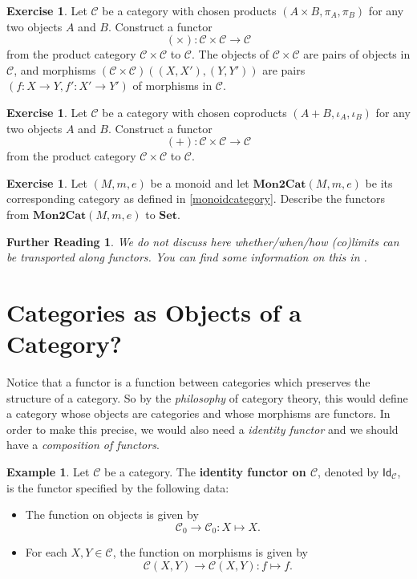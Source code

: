 \documentclass[a4paper,11pt, oneside,titlepage=false]{scrbook}
\theoremstyle{plain}
\newtheorem*{reading*}{Further Reading}
\theoremstyle{definition}
\newtheorem{exa}[thm]{Example}
\newtheorem{exer}[thm]{Exercise}
\newcommand{\cfont}[1]{\ensuremath{\mathsf{#1}}}
\newcommand{\Cat}[1]{\mathcal{#1}}
\newcommand{\CC}{\Cat{C}}
\newcommand{\Catb}[1]{\mathbf{#1}}
\newcommand{\SET}{\Catb{Set}}
\newcommand{\MONtoCAT}{\Catb{Mon2Cat}}
\newcommand{\Ob}[1]{{#1}_0}
\newcommand{\CHom}[3]{{#1}(#2,#3)}
\newcommand{\Id}[1][]{\cfont{Id}_{#1}}
\begin{document}
\begin{exer}
  Let $\CC$ be a category with chosen products $(A\times B, \pi_A, \pi_B)$ for any two objects $A$ and $B$.
  Construct a functor
  \[ (\times) : \CC\times \CC \to \CC\]
  from the product category $\CC\times \CC$ to $\CC$.
  The objects of $\CC\times \CC$ are pairs of objects in $\CC$, and morphisms $\CHom{(\CC\times\CC)}{(X,X')}{(Y,Y')}$ are pairs $(f : X \to Y, f' : X' \to Y')$ of morphisms in $\CC$.
\end{exer}

\begin{exer}
  Let $\CC$ be a category with chosen coproducts $(A + B, \iota_A, \iota_B)$ for any two objects $A$ and $B$.
  Construct a functor
  \[ (+) : \CC\times \CC \to \CC\]
  from the product category $\CC\times \CC$ to $\CC$.
\end{exer}


\begin{exer}\label{ex:monoid_functors}
  Let $(M,m,e)$ be a monoid and let $\MONtoCAT(M,m,e)$ be its corresponding category as defined in \cref{monoidcategory}.
  Describe the functors from $\MONtoCAT(M,m,e)$ to $\SET$.
\end{exer}


\begin{reading*}
  We do not discuss here whether/when/how (co)limits can be transported along functors.
  You can find some information on this in \cite[\S 5.3]{leinster}.
\end{reading*}


\section{Categories as Objects of a Category?}
Notice that a functor is a function between categories which preserves the structure of a category. So by the \textit{philosophy} of category theory, this would define a category whose objects are categories and whose morphisms are functors. In order to make this precise, we would also need a \textit{identity functor} and we should have a \textit{composition of functors}.

\begin{exa}\label{example:functor_id} Let $\CC$ be a category. The \textbf{identity functor on $\CC$}, denoted by $\Id[\CC]$, is the functor specified by the following data:
\begin{itemize}
\item The function on objects is given by
\[
\Ob{\CC}\to \Ob{\CC}: X\mapsto X.
\]
\item For each $X,Y\in\CC$, the function on morphisms is given by
\[
\CHom \CC X Y\to \CHom \CC X Y: f\mapsto f.
\]
\end{itemize}
\end{exa}
\end{document}
